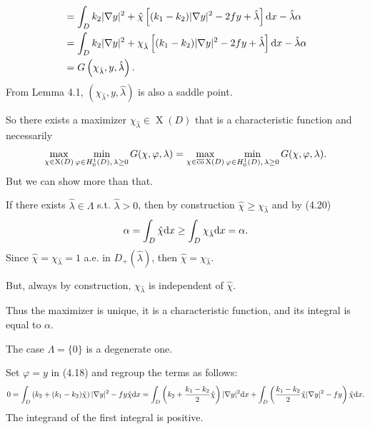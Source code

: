 \documentclass{book}
\numberwithin{equation}{section}
\begin{document}
\begin{enumerate}
\begin{align*}
        &= \int_D k_2|\nabla y|^2 + \hat{\chi}\left[(k_1 - k_2)|\nabla y|^2 - 2fy + \hat{\lambda}\right]{\rm d}x - \hat{\lambda}\alpha\\
        &= \int_D k_2|\nabla y|^2 + \chi_{\hat{\lambda}}\left[(k_1 - k_2)|\nabla y|^2 - 2fy + \hat{\lambda}\right]{\rm d}x - \hat{\lambda}\alpha\\
        &= G\left(\chi_{\hat{\lambda}},y,\hat{\lambda}\right).
    \end{align*}
    From Lemma 4.1, $\left(\chi_{\hat{\lambda}},y,\hat{\lambda}\right)$ is also a saddle point.
    
    So there exists a maximizer $\chi_{\hat{\lambda}}\in\operatorname{X}(D)$ that is a characteristic function and necessarily
    \begin{align*}
        \max_{\chi\in\operatorname{X}(D)}\min_{\varphi\in H_0^1(D),\,\lambda\ge 0} G(\chi,\varphi,\lambda) = \max_{\chi\in\overline{\rm co}\operatorname{X}(D)}\min_{\varphi\in H_0^1(D),\,\lambda\ge 0} G(\chi,\varphi,\lambda).
    \end{align*}
    But we can show more than that.
    
    If there exists $\hat{\lambda}\in\Lambda$ s.t. $\hat{\lambda} > 0$, then by construction $\hat{\chi}\ge\chi_{\hat{\lambda}}$ and by (4.20)
    \begin{align*}
        \alpha = \int_D \hat{\chi}{\rm d}x\ge\int_D \chi_{\hat{\lambda}}{\rm d}x = \alpha.
    \end{align*}
    Since $\hat{\chi} = \chi_{\hat{\lambda}} = 1$ a.e. in $D_+(\hat{\lambda})$, then $\hat{\chi} = \chi_{\hat{\lambda}}$.
    
    But, always by construction, $\chi_{\hat{\lambda}}$ is independent of $\hat{\chi}$.
    
    Thus the maximizer is unique, it is a characteristic function, and its integral is equal to $\alpha$.
    
    The case $\Lambda = \{0\}$ is a degenerate one.
    
    Set $\varphi = y$ in (4.18) and regroup the terms as follows:
    \begin{align*}
        0 = \int_D \left(k_2 + (k_1 - k_2)\hat{\chi}\right)|\nabla y|^2 - fy\hat{\chi}{\rm d}x = \int_D \left(k_2 + \frac{k_1 - k_2}{2}\hat{\chi}\right)|\nabla y|^2{\rm d}x + \int_D \left(\frac{k_ 1 - k_2}{2}\hat{\chi}|\nabla y|^2 - fy\right)\hat{\chi}{\rm d}x.
    \end{align*}
    The integrand of the first integral is positive.
    

\end{enumerate}
\end{document}
